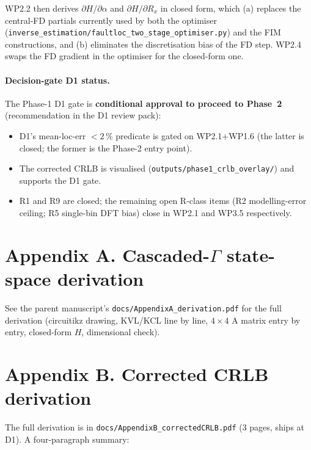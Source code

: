 \documentclass[11pt,a4paper]{article}
\begin{document}
WP2.2 then derives $\partial H/\partial\alpha$ and
$\partial H/\partial R_x$ in closed form, which (a) replaces the
central-FD partials currently used by both the optimiser
(\texttt{inverse\_estimation/faultloc\_two\_stage\_optimiser.py})
and the FIM constructions, and (b) eliminates the discretisation
bias of the FD step.  WP2.4 swaps the FD gradient in the optimiser
for the closed-form one.

\paragraph{Decision-gate D1 status.}  The Phase-1 D1 gate is
\textbf{conditional approval to proceed to Phase~2} (recommendation
in the D1 review pack):
\begin{itemize}[leftmargin=2em]
  \item D1's mean-loc-err $<2\,\%$ predicate is gated on
        WP2.1+WP1.6 (the latter is closed; the former is the
        Phase-2 entry point).
  \item The corrected CRLB is visualised
        (\texttt{outputs/phase1\_crlb\_overlay/}) and supports the
        D1 gate.
  \item R1 and R9 are closed; the remaining open R-class items
        (R2 modelling-error ceiling; R5 single-bin DFT bias)
        close in WP2.1 and WP3.5 respectively.
\end{itemize}

\section*{Appendix A. Cascaded-$\Gamma$ state-space derivation}

See the parent manuscript's
\texttt{docs/AppendixA\_derivation.pdf} for the full derivation
(circuitikz drawing, KVL/KCL line by line, $4\times 4$ A matrix entry
by entry, closed-form $H$, dimensional check).

\section*{Appendix B. Corrected CRLB derivation}\label{app:B}

The full derivation is in
\texttt{docs/AppendixB\_correctedCRLB.pdf} (3 pages, ships at D1).
A four-paragraph summary:
\end{document}
